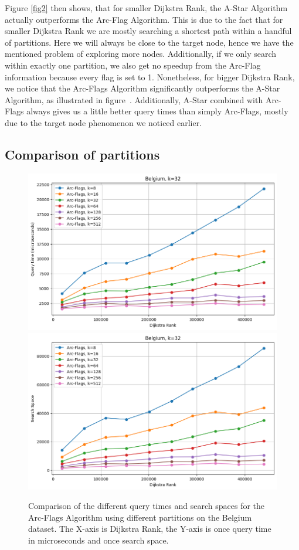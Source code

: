 \documentclass[acmsmall,nonacm,screen,review]{acmart}
\begin{document}
Figure \ref{fig2} then shows, that for smaller Dijkstra Rank, the A-Star Algorithm actually outperforms the Arc-Flag Algorithm. This is due to the fact
that for smaller Dijkstra Rank we are mostly searching a shortest path within a handful of partitions. Here we will
always be close to the target node, hence we have the mentioned problem of exploring more nodes. Additionally, if we only search within exactly one partition,
we also get no speedup from the Arc-Flag information because every flag is set to 1. Nonetheless, for bigger Dijkstra Rank, we notice that the Arc-Flags
Algorithm significantly outperforms the A-Star Algorithm, as illustrated in figure~. Additionally, A-Star combined
with Arc-Flags always gives us a little better query times than simply Arc-Flags, mostly due to the target node phenomenon we noticed earlier.

\subsection{Comparison of partitions}

\begin{figure}[bt!]
    \centering
    \includegraphics[width=0.49\linewidth]{arcflagDifferentKquery.png}
    \includegraphics[width=0.49\linewidth]{arcflagDifferentKsearchspace.png}
    \caption{Comparison of the different query times and search spaces for the Arc-Flags Algorithm using different partitions on the Belgium dataset.
    The X-axis is Dijkstra Rank, the Y-axis is once query time in microseconds and once search space.}
    \label{fig3}
\end{figure}
\end{document}

